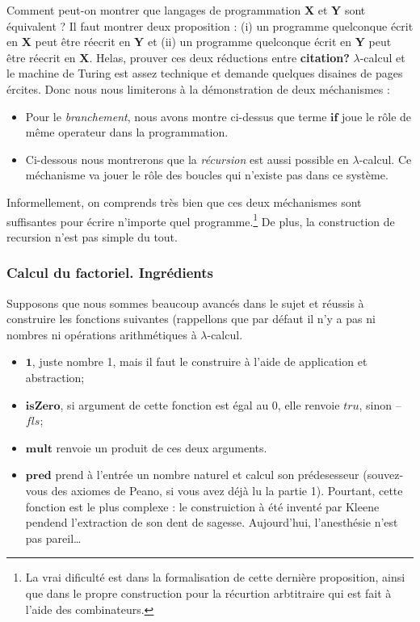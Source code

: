 \documentclass[12pt, a4paper]{article}
\begin{document}
Comment peut-on montrer que langages de programmation \textbf{X} et \textbf{Y} sont équivalent ?
Il faut montrer deux proposition : (i) un programme quelconque écrit en \textbf{X} peut être réecrit en \textbf{Y} et (ii) un programme quelconque écrit en \textbf{Y} peut être réecrit en \textbf{X}.
Helas, prouver ces deux réductions entre \textbf{citation?} $\lambda$-calcul et le machine de Turing est assez technique et demande quelques disaines de pages ércites.
Donc nous nous limiterons à la démonstration de deux méchanismes :
\begin{itemize}
	\item Pour le \emph{branchement}, nous avons montre ci-dessus que terme $\mathbf{if}$ joue le rôle de même operateur dans la programmation.
	\item Ci-dessous nous montrerons que la \emph{récursion} est aussi possible en $\lambda$-calcul. Ce méchanisme va jouer le rôle des boucles qui n'existe pas dans ce système.
\end{itemize}
Informellement, on comprends très bien que ces deux méchanismes sont suffisantes pour écrire n'importe quel programme.\footnote{La vrai dificulté est dans la formalisation de cette dernière proposition, ainsi que dans le propre construction pour la récurtion arbtitraire qui est fait à l'aide des combinateurs.}
De plus, la construction de recursion n'est pas simple du tout.

\subsubsection*{Calcul du factoriel. Ingrédients}
Supposons que nous sommes beaucoup avancés dans le sujet et réussis à construire les fonctions suivantes (rappellons que par défaut il n'y a pas ni nombres ni opérations arithmétiques à $\lambda$-calcul.
\begin{itemize}
	\item $\mathbf{1}$, juste nombre 1, mais il faut le construire à l'aide de application et abstraction;
	\item $\mathbf{isZero}$, si argument de cette fonction est égal au 0, elle renvoie $tru$, sinon -- $fls$;
	\item $\mathbf{mult}$ renvoie un produit de ces deux arguments.
	\item $\mathbf{pred}$ prend à l'entrée un nombre naturel et calcul son prédesesseur (souvez-vous des axiomes de Peano, si vous avez déjà lu la partie 1). Pourtant, cette fonction est le plus complexe : le construiction à été inventé par Kleene pendend l'extraction de son dent de sagesse. Aujourd'hui, l'anesthésie n'est pas pareil\ldots
\end{itemize}
\end{document}
